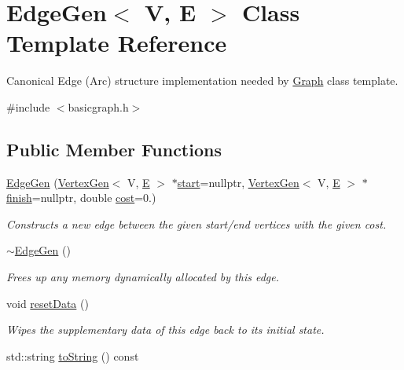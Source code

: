 \hypertarget{classEdgeGen}{}\section{Edge\+Gen$<$ V, E $>$ Class Template Reference}
\label{classEdgeGen}


Canonical Edge (Arc) structure implementation needed by \mbox{\hyperlink{classGraph}{Graph}} class template.  




{\ttfamily \#include $<$basicgraph.\+h$>$}

\subsection*{Public Member Functions}
\begin{DoxyCompactItemize}
\item 
\mbox{\hyperlink{classEdgeGen_ae5c19ab1e12270d728be0cea54ce0cee}{Edge\+Gen}} (\mbox{\hyperlink{classVertexGen}{Vertex\+Gen}}$<$ V, \mbox{\hyperlink{gmath_8h_ab587ba72a9c23f238cb4fd70e2fdb545}{E}} $>$ $\ast$\mbox{\hyperlink{classEdgeGen_a07618520fc4dd27e13fbeb28ef912ffb}{start}}=nullptr, \mbox{\hyperlink{classVertexGen}{Vertex\+Gen}}$<$ V, \mbox{\hyperlink{gmath_8h_ab587ba72a9c23f238cb4fd70e2fdb545}{E}} $>$ $\ast$\mbox{\hyperlink{classEdgeGen_aa60a74288596350c2d66c545a2a57a4e}{finish}}=nullptr, double \mbox{\hyperlink{classEdgeGen_a3091a0127c4b13192de722c371142180}{cost}}=0.)
\begin{DoxyCompactList}\small\item\em Constructs a new edge between the given start/end vertices with the given cost. \end{DoxyCompactList}\item 
\mbox{\hyperlink{classEdgeGen_aba5698da01314eb1362d7a594e411347}{$\sim$\+Edge\+Gen}} ()
\begin{DoxyCompactList}\small\item\em Frees up any memory dynamically allocated by this edge. \end{DoxyCompactList}\item 
void \mbox{\hyperlink{classEdgeGen_acaf456f6fcda155c25ae4489153a2cbf}{reset\+Data}} ()
\begin{DoxyCompactList}\small\item\em Wipes the supplementary data of this edge back to its initial state. \end{DoxyCompactList}\item 
std\+::string \mbox{\hyperlink{classEdgeGen_a33b48d2c020490a9ef88a16c1a90e3d2}{to\+String}} () const

\end{DoxyCompactItemize}
